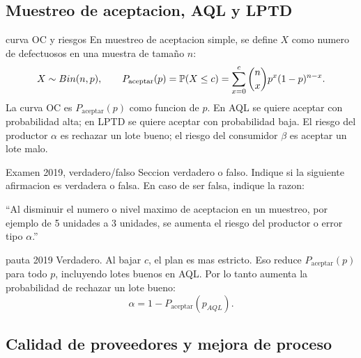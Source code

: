\subsection{Muestreo de aceptacion, AQL y LPTD}

\begin{materia}{curva OC y riesgos}
En muestreo de aceptacion simple, se define $X$ como numero de defectuosos en una muestra de tamaño $n$:
\[
  X\sim Bin(n,p),\qquad
  P_{\text{aceptar}}(p)=\mathbb{P}(X\le c)=\sum_{x=0}^{c}\binom{n}{x}p^x(1-p)^{n-x}.
\]
La curva OC es $P_{\text{aceptar}}(p)$ como funcion de $p$. En AQL se quiere aceptar con probabilidad alta; en LPTD se quiere aceptar con probabilidad baja. El riesgo del productor $\alpha$ es rechazar un lote bueno; el riesgo del consumidor $\beta$ es aceptar un lote malo.
\end{materia}

\begin{enunciado}{Examen 2019, verdadero/falso}
Seccion verdadero o falso. Indique si la siguiente afirmacion es verdadera o falsa. En caso de ser falsa, indique la razon:

``Al disminuir el numero o nivel maximo de aceptacion en un muestreo, por ejemplo de 5 unidades a 3 unidades, se aumenta el riesgo del productor o error tipo $\alpha$.''
\end{enunciado}

\begin{pautacompleta}{pauta 2019}
Verdadero. Al bajar $c$, el plan es mas estricto. Eso reduce $P_{\text{aceptar}}(p)$ para todo $p$, incluyendo lotes buenos en AQL. Por lo tanto aumenta la probabilidad de rechazar un lote bueno:
\[
  \alpha=1-P_{\text{aceptar}}(p_{AQL}).
\]
\end{pautacompleta}

\subsection{Calidad de proveedores y mejora de proceso}

